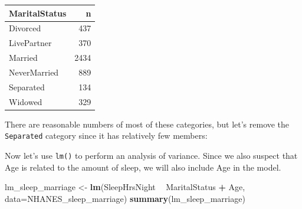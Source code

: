 \documentclass[12pt,]{book}
\newenvironment{Shaded}{\begin{snugshade}}{\end{snugshade}}
\newcommand{\DataTypeTok}[1]{\textcolor[rgb]{0.13,0.29,0.53}{#1}}
\newcommand{\KeywordTok}[1]{\textcolor[rgb]{0.13,0.29,0.53}{\textbf{#1}}}
\newcommand{\NormalTok}[1]{#1}
\newcommand{\OperatorTok}[1]{\textcolor[rgb]{0.81,0.36,0.00}{\textbf{#1}}}
\newcommand{\StringTok}[1]{\textcolor[rgb]{0.31,0.60,0.02}{#1}}
\begin{document}
\begin{Shaded}
\end{Shaded}

\begin{tabular}{l|r}
\hline
MaritalStatus & n\\
\hline
Divorced & 437\\
\hline
LivePartner & 370\\
\hline
Married & 2434\\
\hline
NeverMarried & 889\\
\hline
Separated & 134\\
\hline
Widowed & 329\\
\hline
\end{tabular}

There are reasonable numbers of most of these categories, but let's remove the \texttt{Separated} category since it has relatively few members:

\begin{Shaded}
\end{Shaded}

Now let's use \texttt{lm()} to perform an analysis of variance. Since we also suspect that Age is related to the amount of sleep, we will also include Age in the model.

\begin{Shaded}
\begin{Highlighting}[]
\NormalTok{lm_sleep_marriage <-}\StringTok{ }\KeywordTok{lm}\NormalTok{(SleepHrsNight }\OperatorTok{~}\StringTok{ }\NormalTok{MaritalStatus }\OperatorTok{+}\StringTok{ }\NormalTok{Age,}
                        \DataTypeTok{data=}\NormalTok{NHANES_sleep_marriage)}
\KeywordTok{summary}\NormalTok{(lm_sleep_marriage)}
\end{Highlighting}
\end{Shaded}
\end{document}
